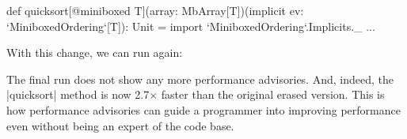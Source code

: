 \begin{lstlisting-nobreak}
def quicksort[@miniboxed T](array: MbArray[T])(implicit ev: `MiniboxedOrdering`[T]): Unit = {
  import `MiniboxedOrdering`.Implicits._
  ...
}
\end{lstlisting-nobreak}

With this change, we can run again:


The final run does not show any more performance advisories. And, indeed, the |quicksort| method is now 2.7$\times$ faster than the original erased version. This is how performance advisories can guide a programmer into improving performance even without being an expert of the code base.